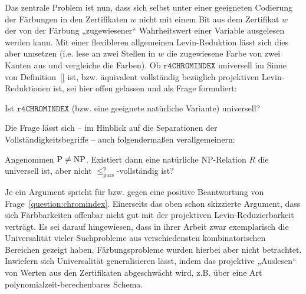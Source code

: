 Das zentrale Problem ist nun, dass sich selbst unter einer geeigneten Codierung der Färbungen in den Zertifikaten $w$ nicht mit einem Bit aus dem Zertifikat $w$ der von der Färbung „zugewiesener“ Wahrheitswert einer Variable ausgelesen werden kann. Mit einer flexibleren allgemeinen Levin-Reduktion lässt sich dies aber umsetzen (i.e. lese an zwei Stellen in $w$ die zugewiesene Farbe von zwei Kanten aus und vergleiche die Farben). Ob $\mathtt{r4CHROMINDEX}$ universell im Sinne von Definition~\ref{} ist, bzw. äquivalent vollständig bezüglich projektiven Levin-Reduktionen ist, sei hier offen gelassen und als Frage formuliert:
\begin{question}\label{question:chromindex}
    Ist $\mathtt{r4CHROMINDEX}$ (bzw. eine geeignete natürliche Variante) universell?
\end{question}
Die Frage lässt sich -- im Hinblick auf die Separationen der Vollständigkeitsbegriffe -- auch  folgendermaßen verallgemeinern:
\begin{question}
    Angenommen $\mathrm{P}\neq\mathrm{NP}$.
    Existiert dann eine natürliche NP-Relation $R$ die universell ist, aber nicht $\leq_\mathrm{pars}^\mathrm p$-vollständig ist?
\end{question}

Je ein Argument spricht für bzw. gegen eine positive Beantwortung von Frage~\ref{question:chromindex}.
Einerseits das oben schon skizzierte Argument, dass sich Färbbarkeiten offenbar nicht gut mit der projektiven Levin-Reduzierbarkeit verträgt.  Es sei darauf hingewiesen, dass \textcite{agrawal_universal_1992} in ihrer Arbeit zwar exemplarisch die Universalität vieler Suchprobleme aus verschiedensten kombinatorischen Bereichen gezeigt haben, Färbungsprobleme wurden hierbei aber nicht betrachtet. 
Inwiefern sich Universalität generalisieren lässt, indem das projektive „Auslesen“ von Werten aus den Zertifikaten abgeschwächt wird, z.B. über eine Art polynomialzeit-berechenbares Schema.

